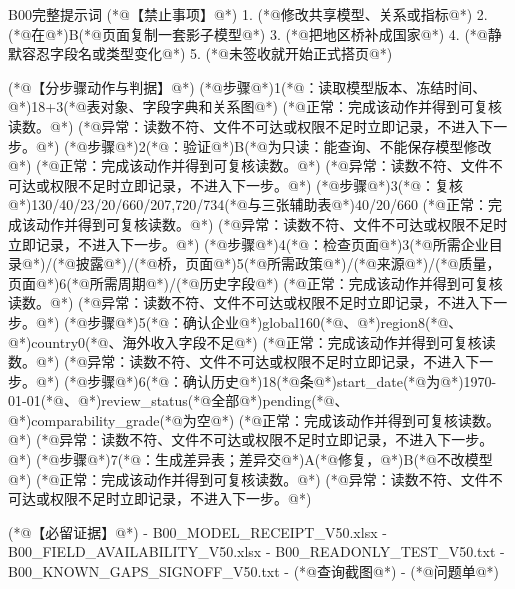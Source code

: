 \documentclass[UTF8,openany,zihao=-4]{ctexbook}
\renewcommand{\_}{\textunderscore\allowbreak}
\begin{document}
\begin{PromptBox}{B00完整提示词}
(*@{\promptcjk 【禁止事项】}@*)
1. (*@{\promptcjk 修改共享模型、关系或指标}@*)
2. (*@{\promptcjk 在}@*)B(*@{\promptcjk 页面复制一套影子模型}@*)
3. (*@{\promptcjk 把地区桥补成国家}@*)
4. (*@{\promptcjk 静默容忍字段名或类型变化}@*)
5. (*@{\promptcjk 未签收就开始正式搭页}@*)

(*@{\promptcjk 【分步骤动作与判据】}@*)
(*@{\promptcjk 步骤}@*)1(*@{\promptcjk ：读取模型版本、冻结时间、}@*)18+3(*@{\promptcjk 表对象、字段字典和关系图}@*)
  (*@{\promptcjk 正常：完成该动作并得到可复核读数。}@*)
  (*@{\promptcjk 异常：读数不符、文件不可达或权限不足时立即记录，不进入下一步。}@*)
(*@{\promptcjk 步骤}@*)2(*@{\promptcjk ：验证}@*)B(*@{\promptcjk 为只读：能查询、不能保存模型修改}@*)
  (*@{\promptcjk 正常：完成该动作并得到可复核读数。}@*)
  (*@{\promptcjk 异常：读数不符、文件不可达或权限不足时立即记录，不进入下一步。}@*)
(*@{\promptcjk 步骤}@*)3(*@{\promptcjk ：复核}@*)130/40/23/20/660/207,720/734(*@{\promptcjk 与三张辅助表}@*)40/20/660
  (*@{\promptcjk 正常：完成该动作并得到可复核读数。}@*)
  (*@{\promptcjk 异常：读数不符、文件不可达或权限不足时立即记录，不进入下一步。}@*)
(*@{\promptcjk 步骤}@*)4(*@{\promptcjk ：检查页面}@*)3(*@{\promptcjk 所需企业目录}@*)/(*@{\promptcjk 披露}@*)/(*@{\promptcjk 桥，页面}@*)5(*@{\promptcjk 所需政策}@*)/(*@{\promptcjk 来源}@*)/(*@{\promptcjk 质量，页面}@*)6(*@{\promptcjk 所需周期}@*)/(*@{\promptcjk 历史字段}@*)
  (*@{\promptcjk 正常：完成该动作并得到可复核读数。}@*)
  (*@{\promptcjk 异常：读数不符、文件不可达或权限不足时立即记录，不进入下一步。}@*)
(*@{\promptcjk 步骤}@*)5(*@{\promptcjk ：确认企业}@*)global160(*@{\promptcjk 、}@*)region8(*@{\promptcjk 、}@*)country0(*@{\promptcjk 、海外收入字段不足}@*)
  (*@{\promptcjk 正常：完成该动作并得到可复核读数。}@*)
  (*@{\promptcjk 异常：读数不符、文件不可达或权限不足时立即记录，不进入下一步。}@*)
(*@{\promptcjk 步骤}@*)6(*@{\promptcjk ：确认历史}@*)18(*@{\promptcjk 条}@*)start_date(*@{\promptcjk 为}@*)1970-01-01(*@{\promptcjk 、}@*)review_status(*@{\promptcjk 全部}@*)pending(*@{\promptcjk 、}@*)comparability_grade(*@{\promptcjk 为空}@*)
  (*@{\promptcjk 正常：完成该动作并得到可复核读数。}@*)
  (*@{\promptcjk 异常：读数不符、文件不可达或权限不足时立即记录，不进入下一步。}@*)
(*@{\promptcjk 步骤}@*)7(*@{\promptcjk ：生成差异表；差异交}@*)A(*@{\promptcjk 修复，}@*)B(*@{\promptcjk 不改模型}@*)
  (*@{\promptcjk 正常：完成该动作并得到可复核读数。}@*)
  (*@{\promptcjk 异常：读数不符、文件不可达或权限不足时立即记录，不进入下一步。}@*)

(*@{\promptcjk 【必留证据】}@*)
- B00_MODEL_RECEIPT_V50.xlsx
- B00_FIELD_AVAILABILITY_V50.xlsx
- B00_READONLY_TEST_V50.txt
- B00_KNOWN_GAPS_SIGNOFF_V50.txt
- (*@{\promptcjk 查询截图}@*)
- (*@{\promptcjk 问题单}@*)


\end{PromptBox}
\end{document}
